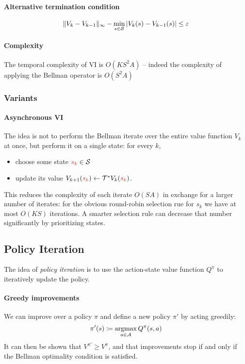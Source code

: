 \documentclass[../course-notes.tex]{subfiles}
\begin{document}
\paragraph{Alternative termination condition}
\[
	\|V_k-V_{k-1}\|_\infty -
	\min_{s\in\mathcal{S}} |V_k(s) - V_{k-1}(s)| \leq \varepsilon
\]

\paragraph{Complexity} The temporal complexity of VI is $O(KS^2A)$ -- indeed the complexity of applying the Bellman operator is $O(S^2A)$



\subsubsection{Variants}

\paragraph{Asynchronous VI} The idea is not to perform the Bellman iterate over the entire value function $V_k$ at once, but perform it on a single state: for every $k$,
\begin{itemize}
	\item choose some state ${\redfont s_k} \in \calS$
	\item update its value $V_{k+1}({\redfont s_k}) \leftarrow \calT^*V_k({\redfont s_k})$.
\end{itemize}
This reduces the complexity of each iterate $O(SA)$ in exchange for a larger number of iterates: for the obvious round-robin selection rue for $s_k$ we have at most $O(KS)$ iterations. A smarter selection rule can decrease that number significantly by prioritizing states.




\subsection{Policy Iteration}

The idea of \textit{policy iteration} is to use the action-state value function $Q^\pi$ to iteratively update the policy.

\paragraph{Greedy improvements} We can improve over a policy $\pi$ and define a new policy $\pi'$ by acting greedily:
\[
	\pi'(s) \coloneqq \operatorname*{\mathrm{argmax}}_{a\in\mathcal{A}} Q^\pi(s,a)
\]
It can then be shown that $V^{\pi'} \geq V^{\pi}$, and that improvements stop if and only if the Bellman optimality condition is satisfied.
\end{document}

